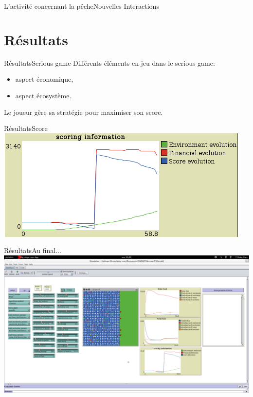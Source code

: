 \documentclass[t, 10pt]{beamer}
\begin{document}
        \begin{frame}{L'activité concernant la pêche}{Nouvelles Interactions}
          \begin{figure}[htbp]
	    \makebox[\textwidth]{\hrulefill}{
	      \small
	      
	      \normalsize}
	  \end{figure}
        \end{frame}
        
        \section{Résultats}
	
        \begin{frame}[c]{Résultats}{Serious-game}
          Différents éléments en jeu dans le serious-game:
          \begin{itemize}
          \item{aspect économique,}
          \item{aspect écosystème.}
          \end{itemize}
          Le joueur gère sa stratégie pour maximiser son score.
        \end{frame}
        
        \begin{frame}{Résultats}{Score}
          \includegraphics[width=\textwidth]{img/score.png}
        \end{frame}
        
        \begin{frame}{Résultats}{Au final...}
          \includegraphics[width=\textwidth]{img/resultat.png}
        \end{frame}
        
\end{document}
